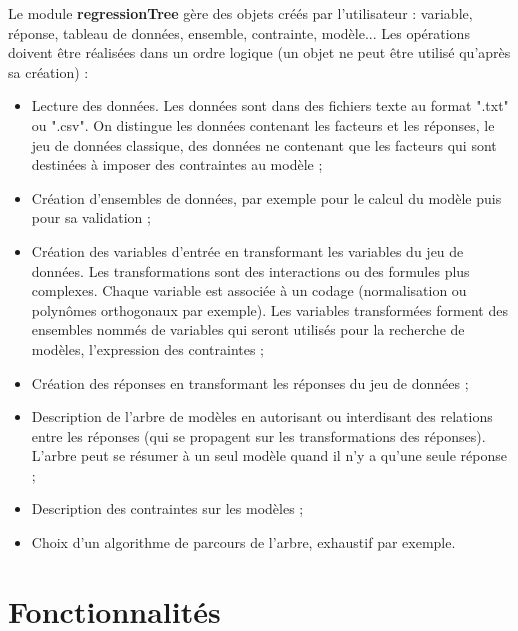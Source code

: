 \documentclass{article}
\newcommand{\regt}{\textbf{regressionTree }}
\begin{document}
Le module \regt gère des objets créés par l'utilisateur : variable, réponse, tableau de données, ensemble, contrainte, modèle... Les opérations doivent être réalisées dans un ordre logique (un objet ne peut être utilisé qu'après sa création) :
\begin{itemize}
	\item Lecture des données. Les données sont dans des fichiers texte au format ".txt" ou ".csv". On distingue les données contenant les facteurs et les réponses, le jeu de données classique, des données ne contenant que les facteurs qui sont destinées à imposer des contraintes au modèle ;
	\item Création d'ensembles de données, par exemple pour le calcul du modèle puis pour sa validation ;
	\item Création des variables d'entrée en transformant les variables du jeu de données. Les transformations sont des interactions ou des formules plus complexes. Chaque variable est associée à un codage (normalisation ou polynômes orthogonaux par exemple). Les variables transformées forment des ensembles nommés de variables qui seront utilisés pour la recherche de modèles, l'expression des contraintes ;
	\item Création des réponses en transformant les réponses du jeu de données ;
	\item Description de l'arbre de modèles en autorisant ou interdisant des relations entre les réponses (qui se propagent sur les transformations des réponses). L'arbre peut se résumer à un seul modèle quand il n'y a qu'une seule réponse ;
	\item Description des contraintes sur les modèles ;
	\item Choix d'un algorithme de parcours de l'arbre, exhaustif par exemple.
\end{itemize}

\section{Fonctionnalités}
\end{document}
